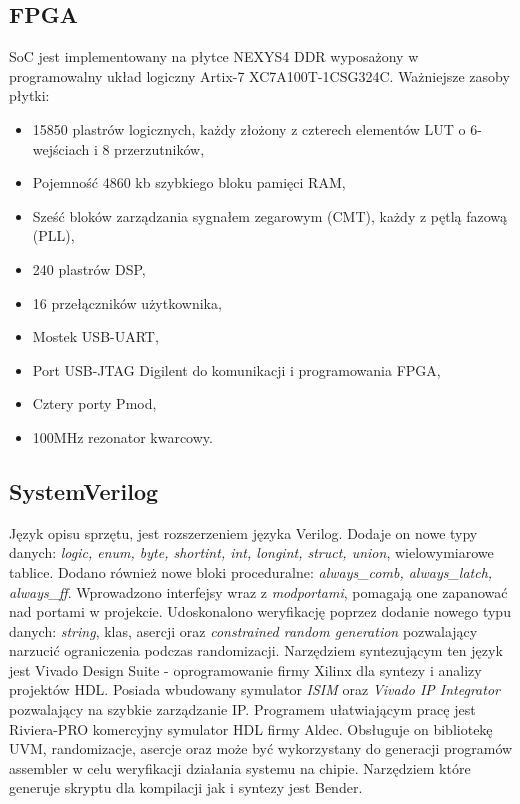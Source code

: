 \documentclass[11pt,a4paper]{article}
\begin{document}
	\subsection{FPGA}
	\hspace{5mm}
		SoC jest implementowany na płytce NEXYS4 DDR wyposażony w programowalny układ logiczny Artix-7 XC7A100T-1CSG324C. Ważniejsze zasoby płytki:\cite{nexys}
		\begin{itemize}
			\item 15850 plastrów logicznych, każdy złożony z czterech elementów LUT o 6-wejściach i 8 przerzutników,
			\item Pojemność 4860 kb szybkiego bloku pamięci RAM,
			\item Sześć bloków zarządzania sygnałem zegarowym (CMT), każdy z pętlą fazową (PLL),
			\item 240 plastrów DSP,
			\item 16 przełączników użytkownika,
			\item Mostek USB-UART,
			\item Port USB-JTAG Digilent do komunikacji i programowania FPGA,
			\item Cztery porty Pmod,
			\item 100MHz rezonator kwarcowy.
		\end{itemize}

	\subsection{SystemVerilog}
	\hspace{5mm}
		Język opisu sprzętu, jest rozszerzeniem języka Verilog. Dodaje on nowe typy danych: \textit{logic, enum, byte, shortint, int, longint, struct, union}, wielowymiarowe tablice. Dodano również nowe bloki proceduralne: \textit{always\_comb, always\_latch, always\_ff}. Wprowadzono interfejsy wraz z \textit{modportami}, pomagają one zapanować nad portami w projekcie. Udoskonalono weryfikację poprzez dodanie nowego typu danych: \textit{string}, klas, asercji oraz \textit{constrained random generation} pozwalający narzucić ograniczenia podczas randomizacji\cite{SV}.
Narzędziem syntezującym ten język jest Vivado Design Suite - oprogramowanie firmy Xilinx dla syntezy i analizy projektów HDL. Posiada wbudowany symulator \textit{ISIM} oraz \textit{Vivado IP Integrator} pozwalający na szybkie zarządzanie IP. Programem ułatwiającym pracę jest Riviera-PRO komercyjny symulator HDL firmy Aldec. Obsługuje on bibliotekę UVM, randomizacje, asercje oraz może być wykorzystany do generacji programów assembler w celu weryfikacji działania systemu na chipie. Narzędziem które generuje skryptu dla kompilacji jak i syntezy jest Bender.
				
\end{document}
